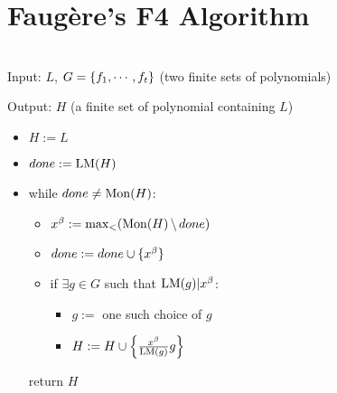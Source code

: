 \chapter{Faug\`ere's F4 Algorithm}

\begin{definition}
    \label{def:SymbolicPreprocessing}
    ~\\
    
    Input: \(L\), \(G = \{ f_1, \cdots, f_t \}\)
    (two finite sets of polynomials)

    Output: \(H\) (a finite set of polynomial containing \(L\))

    \begin{itemize}
        \item \(H := L\)
        \item \(done := \mathrm{LM}(H)\)
        \item while \(done \ne \mathrm{Mon}(H)\):
            \begin{itemize}
                \item \(x^\beta := \max_{<} (\mathrm{Mon}(H) \,\backslash\, done)\)
                \item \(done := done \cup \{ x^\beta \}\)
                \item if \(\exists g \in G\) such that \(\mathrm{LM}(g) | x^\beta\):
                    \begin{itemize}
                        \item \(g :=\) one such choice of \(g\)
                        \item \(H := H \cup \left\{ \frac{x^\beta}{\mathrm{LM}(g)} g \right\}\)
                    \end{itemize}
            \end{itemize}
        return \(H\)
    \end{itemize}
\end{definition}

